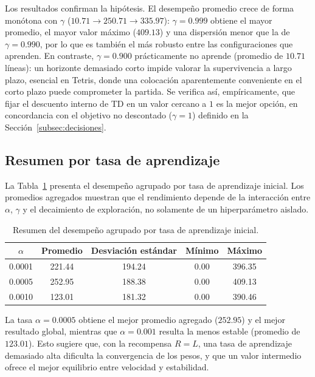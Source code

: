 Los resultados confirman la hipótesis. El desempeño promedio crece de forma monótona con $\gamma$ ($10.71 \to 250.71 \to 335.97$): $\gamma=0.999$ obtiene el mayor promedio, el mayor valor máximo ($409.13$) y una dispersión menor que la de $\gamma=0.990$, por lo que es también el más robusto entre las configuraciones que aprenden. En contraste, $\gamma=0.900$ prácticamente no aprende (promedio de $10.71$ líneas): un horizonte demasiado corto impide valorar la supervivencia a largo plazo, esencial en Tetris, donde una colocación aparentemente conveniente en el corto plazo puede comprometer la partida. Se verifica así, empíricamente, que fijar el descuento interno de TD en un valor cercano a $1$ es la mejor opción, en concordancia con el objetivo no descontado ($\gamma=1$) definido en la Sección~\ref{subsec:decisiones}.

\subsection{Resumen por tasa de aprendizaje}

La Tabla~\ref{tab:sweep_alpha} presenta el desempeño agrupado por tasa de aprendizaje inicial. Los promedios agregados muestran que el rendimiento depende de la interacción entre $\alpha$, $\gamma$ y el decaimiento de exploración, no solamente de un hiperparámetro aislado.

\begin{table}
\centering
\small
\caption{Resumen del desempeño agrupado por tasa de aprendizaje inicial.}
\label{tab:sweep_alpha}
\begin{tabular}{ccccc}
\hline
$\alpha$ & Promedio & Desviación estándar & Mínimo & Máximo \\
\hline
0.0001 & 221.44 & 194.24 & 0.00 & 396.35 \\
0.0005 & 252.95 & 188.38 & 0.00 & 409.13 \\
0.0010 & 123.01 & 181.32 & 0.00 & 390.46 \\
\hline
\end{tabular}
\end{table}

La tasa $\alpha=0.0005$ obtiene el mejor promedio agregado ($252.95$) y el mejor resultado global, mientras que $\alpha=0.001$ resulta la menos estable (promedio de $123.01$). Esto sugiere que, con la recompensa $R=L$, una tasa de aprendizaje demasiado alta dificulta la convergencia de los pesos, y que un valor intermedio ofrece el mejor equilibrio entre velocidad y estabilidad.

